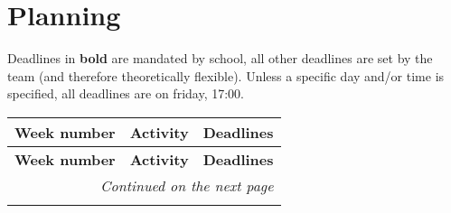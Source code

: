 \documentclass{article}
\begin{document}
\section{Planning}
Deadlines in \textbf{bold} are mandated by school, all other deadlines are set by the team (and therefore theoretically flexible).
Unless a specific day and/or time is specified, all deadlines are on friday, 17:00.
\begin{longtable}{|l|p{}|p{}|}
    \hline
    \textbf{Week number} & \textbf{Activity}                         & \textbf{Deadlines}                      \\ \hline
    \endfirsthead

    \hline
    \textbf{Week number} & \textbf{Activity}                         & \textbf{Deadlines}                      \\ \hline
    \endhead

    \hline \multicolumn{3}{r}{\textit{Continued on the next page}}                                             \\ \hline
    \endfoot

    \hline
    \endlastfoot


\end{longtable}
\end{document}
